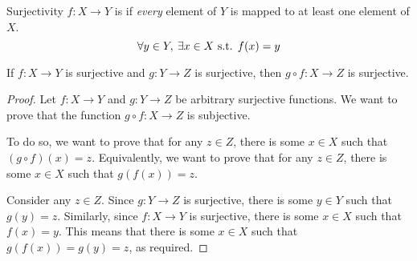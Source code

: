 \begin{defn}{Surjectivity}{}
$f:X\to Y$ is  if \emph{every} element of $Y$ is mapped to at least one element of $X$.
\[ \forall y\in Y,\:\exists x\in X \text{ s.t. } f(x)=y \]
\end{defn}

\begin{proposition}
If $f:X\to Y$ is surjective and $g:Y\to Z$ is surjective, then $g \circ f:X\to Z$ is surjective.
\end{proposition}
\begin{proof}
Let $f:X\to Y$ and $g:Y\to Z$ be arbitrary surjective functions. We want to prove that the function $g \circ f:X\to Z$ is subjective. 

To do so, we want to prove that for any $z \in Z$, there is some $x \in X$ such that $(g \circ f)(x) = z$. Equivalently, we want to prove that for any $z \in Z$, there is some $x \in X$ such that $g(f(x)) = z$.

Consider any $z \in Z$. Since $g:Y\to Z$ is surjective, there is some $y \in Y$ such that $g(y) = z$. Similarly, since $f:X\to Y$ is surjective, there is some $x \in X$ such that $f(x) = y$. This means that there is some $x \in X$ such that $g(f(x)) = g(y) = z$, as required.
\end{proof}

